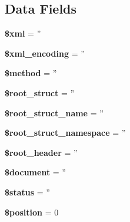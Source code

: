 \subsection*{Data Fields}
\begin{DoxyCompactItemize}
\item 
\hypertarget{classsoap__parser_aa108d9d91e700ac530401dd363b0723b}{{\bfseries \$xml} = ''}\label{classsoap__parser_aa108d9d91e700ac530401dd363b0723b}

\item 
\hypertarget{classsoap__parser_a1e2ee3fea6dbb8374da999a9df7d024d}{{\bfseries \$xml\-\_\-encoding} = ''}\label{classsoap__parser_a1e2ee3fea6dbb8374da999a9df7d024d}

\item 
\hypertarget{classsoap__parser_a12661b2fc0f57f97e30a1620889ce9c6}{{\bfseries \$method} = ''}\label{classsoap__parser_a12661b2fc0f57f97e30a1620889ce9c6}

\item 
\hypertarget{classsoap__parser_af3a5b957348b6e993c324ff19bf3b538}{{\bfseries \$root\-\_\-struct} = ''}\label{classsoap__parser_af3a5b957348b6e993c324ff19bf3b538}

\item 
\hypertarget{classsoap__parser_a5402eddc07a9c8642c2071974fed61b8}{{\bfseries \$root\-\_\-struct\-\_\-name} = ''}\label{classsoap__parser_a5402eddc07a9c8642c2071974fed61b8}

\item 
\hypertarget{classsoap__parser_ab9fc9293371b688c0cce333416ed5d54}{{\bfseries \$root\-\_\-struct\-\_\-namespace} = ''}\label{classsoap__parser_ab9fc9293371b688c0cce333416ed5d54}

\item 
\hypertarget{classsoap__parser_a75ccce2909a246d14268f80343725a8f}{{\bfseries \$root\-\_\-header} = ''}\label{classsoap__parser_a75ccce2909a246d14268f80343725a8f}

\item 
\hypertarget{classsoap__parser_ac5a31edb787609a3143dec9bfa8063ea}{{\bfseries \$document} = ''}\label{classsoap__parser_ac5a31edb787609a3143dec9bfa8063ea}

\item 
\hypertarget{classsoap__parser_a58391ea75f2d29d5d708d7050b641c33}{{\bfseries \$status} = ''}\label{classsoap__parser_a58391ea75f2d29d5d708d7050b641c33}

\item 
\hypertarget{classsoap__parser_a6e88dcb746884d18f6c89eb9b9c14a42}{{\bfseries \$position} = 0}\label{classsoap__parser_a6e88dcb746884d18f6c89eb9b9c14a42}


\end{DoxyCompactItemize}
